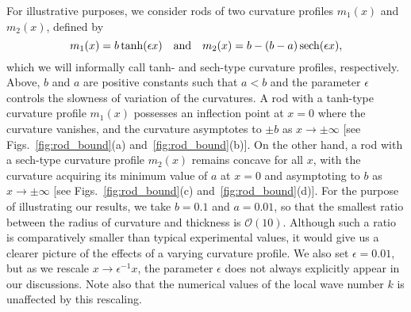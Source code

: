 For illustrative purposes, we consider rods of two curvature profiles $m_{1}(x)$ and $m_{2}(x)$, defined by
%
\begin{equation}
  m_{1}(x) = b\tanh(\epsilon x)
  \quad\text{and}\quad
  m_{2}(x) = b - \left(b - a\right)\operatorname{sech}(\epsilon x),
  \label{eq:rod_curv}
\end{equation}
%
which we will informally call tanh- and sech-type curvature profiles, respectively.
Above, $b$ and $a$ are positive constants such that $a < b$ and the parameter $\epsilon$ controls the slowness of variation of the curvatures.
A rod with a tanh-type curvature profile $m_{1}(x)$ possesses an inflection point at $x=0$ where the curvature vanishes, and the curvature asymptotes to $\pm b$ as $x\to \pm\infty$ [see Figs.~\ref{fig:rod_bound}(a) and~\ref{fig:rod_bound}(b)].
On the other hand, a rod with a sech-type curvature profile $m_{2}(x)$ remains concave for all $x$, with the curvature acquiring its minimum value of $a$ at $x = 0$ and asymptoting to $b$ as $x\to\pm\infty$ [see Figs.~\ref{fig:rod_bound}(c) and~\ref{fig:rod_bound}(d)].
For the purpose of illustrating our results, we take $b = 0.1$ and $a = 0.01$, so that the smallest ratio between the radius of curvature and thickness is $\mathcal{O}(10)$.
Although such a ratio is comparatively smaller than typical experimental values, it would give us a clearer picture of the effects of a varying curvature profile.
We also set $\epsilon = 0.01$, but as we rescale $x \to \epsilon^{-1}x$, the parameter $\epsilon$ does not always explicitly appear in our discussions.
Note also that the numerical values of the local wave number $k$ is unaffected by this rescaling.

